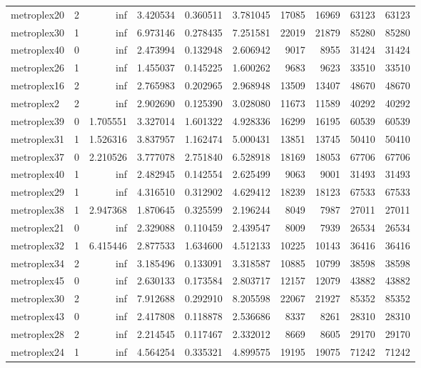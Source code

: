 \begin{longtable}{|l|r|r|r|r|r|r|r|r|r|}
metroplex20 & 2 & inf & 3.420534 & 0.360511 & 3.781045 & 17085 & 16969 & 63123 & 63123 \\
metroplex30 & 1 & inf & 6.973146 & 0.278435 & 7.251581 & 22019 & 21879 & 85280 & 85280 \\
metroplex40 & 0 & inf & 2.473994 & 0.132948 & 2.606942 & 9017 & 8955 & 31424 & 31424 \\
metroplex26 & 1 & inf & 1.455037 & 0.145225 & 1.600262 & 9683 & 9623 & 33510 & 33510 \\
metroplex16 & 2 & inf & 2.765983 & 0.202965 & 2.968948 & 13509 & 13407 & 48670 & 48670 \\
metroplex2 & 2 & inf & 2.902690 & 0.125390 & 3.028080 & 11673 & 11589 & 40292 & 40292 \\
metroplex39 & 0 & 1.705551 & 3.327014 & 1.601322 & 4.928336 & 16299 & 16195 & 60539 & 60539 \\
metroplex31 & 1 & 1.526316 & 3.837957 & 1.162474 & 5.000431 & 13851 & 13745 & 50410 & 50410 \\
metroplex37 & 0 & 2.210526 & 3.777078 & 2.751840 & 6.528918 & 18169 & 18053 & 67706 & 67706 \\
metroplex40 & 1 & inf & 2.482945 & 0.142554 & 2.625499 & 9063 & 9001 & 31493 & 31493 \\
metroplex29 & 1 & inf & 4.316510 & 0.312902 & 4.629412 & 18239 & 18123 & 67533 & 67533 \\
metroplex38 & 1 & 2.947368 & 1.870645 & 0.325599 & 2.196244 & 8049 & 7987 & 27011 & 27011 \\
metroplex21 & 0 & inf & 2.329088 & 0.110459 & 2.439547 & 8009 & 7939 & 26534 & 26534 \\
metroplex32 & 1 & 6.415446 & 2.877533 & 1.634600 & 4.512133 & 10225 & 10143 & 36416 & 36416 \\
metroplex34 & 2 & inf & 3.185496 & 0.133091 & 3.318587 & 10885 & 10799 & 38598 & 38598 \\
metroplex45 & 0 & inf & 2.630133 & 0.173584 & 2.803717 & 12157 & 12079 & 43882 & 43882 \\
metroplex30 & 2 & inf & 7.912688 & 0.292910 & 8.205598 & 22067 & 21927 & 85352 & 85352 \\
metroplex43 & 0 & inf & 2.417808 & 0.118878 & 2.536686 & 8337 & 8261 & 28310 & 28310 \\
metroplex28 & 2 & inf & 2.214545 & 0.117467 & 2.332012 & 8669 & 8605 & 29170 & 29170 \\
metroplex24 & 1 & inf & 4.564254 & 0.335321 & 4.899575 & 19195 & 19075 & 71242 & 71242 \\

\end{longtable}
